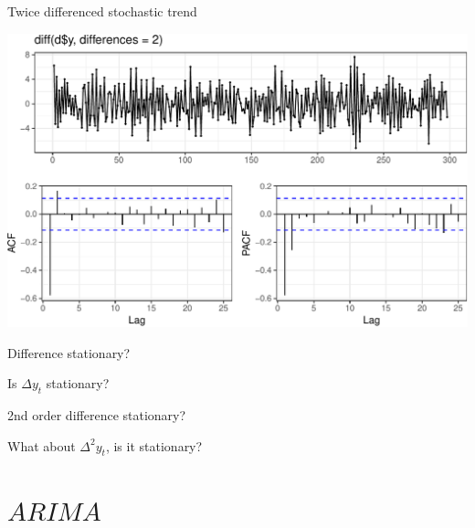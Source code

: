 \documentclass[11pt,ignorenonframetext,]{beamer}
\newenvironment{Shaded}{}{}
\newcommand{\DataTypeTok}[1]{\textcolor[rgb]{0.56,0.13,0.00}{#1}}
\newcommand{\DecValTok}[1]{\textcolor[rgb]{0.25,0.63,0.44}{#1}}
\newcommand{\KeywordTok}[1]{\textcolor[rgb]{0.00,0.44,0.13}{\textbf{#1}}}
\newcommand{\NormalTok}[1]{#1}
\newcommand{\OperatorTok}[1]{\textcolor[rgb]{0.40,0.40,0.40}{#1}}
\let\oldShaded\Shaded
\let\endoldShaded\endShaded
\renewenvironment{Shaded}{\footnotesize\begin{spacing}{0.9}\oldShaded}{\endoldShaded\end{spacing}}
\begin{document}
\begin{frame}[fragile]{%
\protect\hypertarget{twice-differenced-stochastic-trend}{%
Twice differenced stochastic trend}}

\begin{Shaded}
\end{Shaded}

\begin{center}\includegraphics[width=\textwidth]{Lec09_files/figure-beamer/unnamed-chunk-5-1} \end{center}

\end{frame}

\begin{frame}[t]{%
\protect\hypertarget{difference-stationary-1}{%
Difference stationary?}}

Is \(\Delta y_t\) stationary?

\end{frame}

\begin{frame}[t]{%
\protect\hypertarget{nd-order-difference-stationary}{%
2nd order difference stationary?}}

What about \(\Delta^2 y_t\), is it stationary?

\end{frame}

\hypertarget{arima}{%
\section{\texorpdfstring{\(ARIMA\)}{ARIMA}}\label{arima}}
\end{document}
